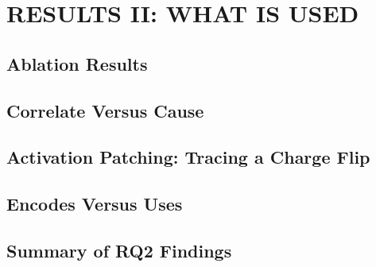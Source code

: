 \chapter{RESULTS II: WHAT IS USED}
\label{ch:results-causal}


\section{Ablation Results}
\section{Correlate Versus Cause}
\section{Activation Patching: Tracing a Charge Flip}
\section{Encodes Versus Uses}
\section{Summary of RQ2 Findings}
